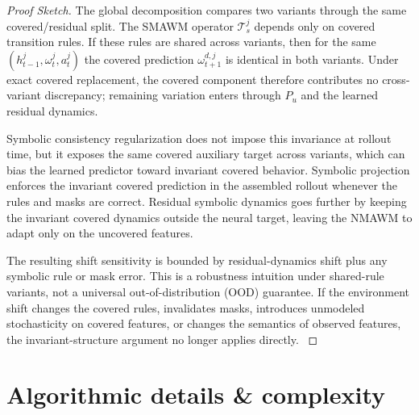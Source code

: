 \documentclass{article}
\theoremstyle{plain}
\theoremstyle{definition}
\theoremstyle{remark}
\begin{document}
\begin{proof}[Proof Sketch]
  The global decomposition compares two variants through the same covered/residual split. The SMAWM operator $\mathcal{T}^j_s$ depends only on covered transition rules. If these rules are shared across variants, then for the same $(h^j_{t-1},\omega^j_t,a^j_t)$ the covered prediction $\omega^{d,j}_{t+1}$ is identical in both variants. Under exact covered replacement, the covered component therefore contributes no cross-variant discrepancy; remaining variation enters through $P_u$ and the learned residual dynamics.

  Symbolic consistency regularization does not impose this invariance at rollout time, but it exposes the same covered auxiliary target across variants, which can bias the learned predictor toward invariant covered behavior. Symbolic projection enforces the invariant covered prediction in the assembled rollout whenever the rules and masks are correct. Residual symbolic dynamics goes further by keeping the invariant covered dynamics outside the neural target, leaving the NMAWM to adapt only on the uncovered features.

  The resulting shift sensitivity is bounded by residual-dynamics shift plus any symbolic rule or mask error. This is a robustness intuition under shared-rule variants, not a universal out-of-distribution (OOD) guarantee. If the environment shift changes the covered rules, invalidates masks, introduces unmodeled stochasticity on covered features, or changes the semantics of observed features, the invariant-structure argument no longer applies directly.
  \label{app:proofs:c4}
\end{proof}


\section{Algorithmic details \& complexity}
\label{app:algorithmic-details}
\end{document}
